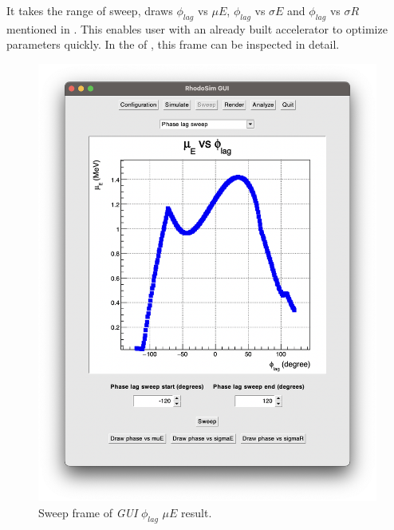 \documentclass[a4paper,oneside,12pt]{report}
\numberwithin{equation}{chapter}
\begin{document}
It takes the range of sweep, draws $\phi_{lag}$ vs $\mu E$, $\phi_{lag}$ vs $\sigma E$ and $\phi_{lag}$ vs $\sigma R$ mentioned in .
This enables user with an already built accelerator to optimize \egun parameters quickly. 
In the  of , this frame can be inspected in detail.
\vspace{10pt}
\begin{figure}[h]
    \centering
    \includegraphics[width=0.85\linewidth]{./figures/rhodoSim/GUI_sweep_muE_3.png}
    \caption{Sweep frame of \textit{GUI} $\phi_{lag}$ $\mu E$ result.}
    \label{fig:gui_sweep_muE}
\end{figure}
\clearpage
\end{document}

